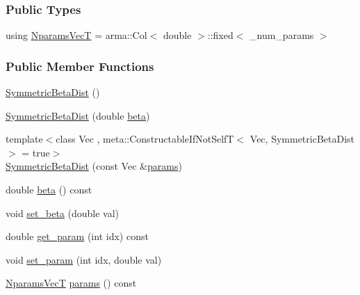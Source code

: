 \subsubsection*{Public Types}
\begin{DoxyCompactItemize}
\item 
using \hyperlink{classprior__hessian_1_1SymmetricBetaDist_a62959cfb48b557fde35822b1c0d9a48d}{Nparams\+VecT} = arma\+::\+Col$<$ double $>$\+::fixed$<$ \+\_\+num\+\_\+params $>$
\end{DoxyCompactItemize}
\subsubsection*{Public Member Functions}
\begin{DoxyCompactItemize}
\item 
\hyperlink{classprior__hessian_1_1SymmetricBetaDist_a46ce349ecb150c81dfa0ebbb2c5b524c}{Symmetric\+Beta\+Dist} ()
\item 
\hyperlink{classprior__hessian_1_1SymmetricBetaDist_acf050eacdd32b4e78f2ae14e13416219}{Symmetric\+Beta\+Dist} (double \hyperlink{classprior__hessian_1_1SymmetricBetaDist_a1e726eb12d98240778d7c0bfaafc7edd}{beta})
\item 
{\footnotesize template$<$class Vec , meta\+::\+Constructable\+If\+Not\+Self\+T$<$ Vec, Symmetric\+Beta\+Dist $>$  = true$>$ }\\\hyperlink{classprior__hessian_1_1SymmetricBetaDist_a0c6b331bfa9bd61d57c6804c01457435}{Symmetric\+Beta\+Dist} (const Vec \&\hyperlink{classprior__hessian_1_1SymmetricBetaDist_a2db7bdb8013ac523f58d2b252ea0dbb4}{params})
\item 
double \hyperlink{classprior__hessian_1_1SymmetricBetaDist_a1e726eb12d98240778d7c0bfaafc7edd}{beta} () const 
\item 
void \hyperlink{classprior__hessian_1_1SymmetricBetaDist_a45a39dc6a12ec1af15a1701023101f1f}{set\+\_\+beta} (double val)
\item 
double \hyperlink{classprior__hessian_1_1SymmetricBetaDist_a286000c0198e921b56821c4552afdaa4}{get\+\_\+param} (int idx) const 
\item 
void \hyperlink{classprior__hessian_1_1SymmetricBetaDist_a5ea7086046d4558c83b2211503501fca}{set\+\_\+param} (int idx, double val)
\item 
\hyperlink{classprior__hessian_1_1SymmetricBetaDist_a62959cfb48b557fde35822b1c0d9a48d}{Nparams\+VecT} \hyperlink{classprior__hessian_1_1SymmetricBetaDist_a2db7bdb8013ac523f58d2b252ea0dbb4}{params} () const 
\item 

\end{DoxyCompactItemize}
